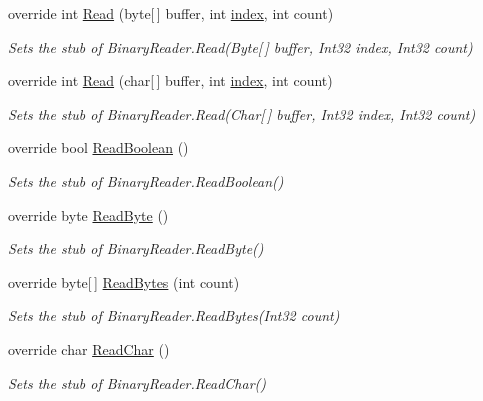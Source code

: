 \begin{DoxyCompactItemize}
override int \hyperlink{class_system_1_1_i_o_1_1_fakes_1_1_stub_binary_reader_a5c89977aecaacbef4a123508562e13a4}{Read} (byte\mbox{[}$\,$\mbox{]} buffer, int \hyperlink{jquery-1_810_82-vsdoc_8js_a75bb12d1f23302a9eea93a6d89d0193e}{index}, int count)
\begin{DoxyCompactList}\small\item\em Sets the stub of Binary\-Reader.\-Read(\-Byte\mbox{[}$\,$\mbox{]} buffer, Int32 index, Int32 count)\end{DoxyCompactList}\item 
override int \hyperlink{class_system_1_1_i_o_1_1_fakes_1_1_stub_binary_reader_a42b24c7ba887507ff7a42bd595ef03d3}{Read} (char\mbox{[}$\,$\mbox{]} buffer, int \hyperlink{jquery-1_810_82-vsdoc_8js_a75bb12d1f23302a9eea93a6d89d0193e}{index}, int count)
\begin{DoxyCompactList}\small\item\em Sets the stub of Binary\-Reader.\-Read(\-Char\mbox{[}$\,$\mbox{]} buffer, Int32 index, Int32 count)\end{DoxyCompactList}\item 
override bool \hyperlink{class_system_1_1_i_o_1_1_fakes_1_1_stub_binary_reader_a76640cf635bddee9639fc77bcf3364f2}{Read\-Boolean} ()
\begin{DoxyCompactList}\small\item\em Sets the stub of Binary\-Reader.\-Read\-Boolean()\end{DoxyCompactList}\item 
override byte \hyperlink{class_system_1_1_i_o_1_1_fakes_1_1_stub_binary_reader_a1445818b26c4da103bff2b0bc1797c7d}{Read\-Byte} ()
\begin{DoxyCompactList}\small\item\em Sets the stub of Binary\-Reader.\-Read\-Byte()\end{DoxyCompactList}\item 
override byte\mbox{[}$\,$\mbox{]} \hyperlink{class_system_1_1_i_o_1_1_fakes_1_1_stub_binary_reader_a745600882baed82ecef670a910b5a6b7}{Read\-Bytes} (int count)
\begin{DoxyCompactList}\small\item\em Sets the stub of Binary\-Reader.\-Read\-Bytes(\-Int32 count)\end{DoxyCompactList}\item 
override char \hyperlink{class_system_1_1_i_o_1_1_fakes_1_1_stub_binary_reader_a2192001f3175b100516c6b2f140f0c0c}{Read\-Char} ()
\begin{DoxyCompactList}\small\item\em Sets the stub of Binary\-Reader.\-Read\-Char()\end{DoxyCompactList}\item 

\end{DoxyCompactItemize}
